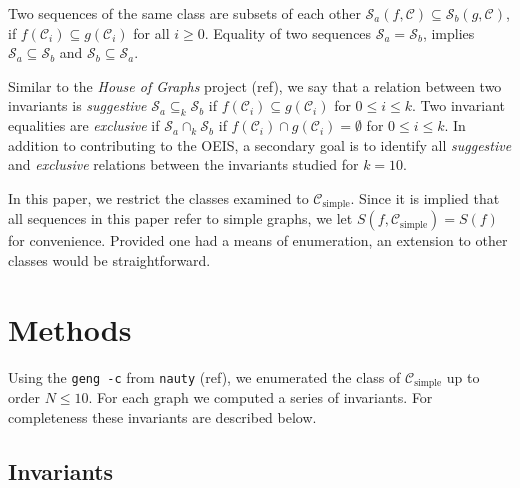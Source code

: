\documentclass[12pt]{article}
\newcommand{\SEQ}{\mathcal{S}}
\newcommand{\CLASS}{\mathcal{C}}
\newcommand{\SIMPLECLASS}{\mathcal{C}_\text{simple}}
\begin{document}
Two sequences of the same class are subsets of each other $\SEQ_a(f,\CLASS) \subseteq \SEQ_b(g, \CLASS)$, if $f(\CLASS_i) \subseteq g(\CLASS_i)$ for all $i\ge0$.
Equality of two sequences $\SEQ_a = \SEQ_b$, implies $\SEQ_a \subseteq \SEQ_b$ and $\SEQ_b \subseteq \SEQ_a$. 

Similar to the \textit{House of Graphs} project (ref), we say that a relation between two invariants is \textit{suggestive} $\SEQ_a \subseteq_k \SEQ_b$ if $f(\CLASS_i) \subseteq g(\CLASS_i)$ for $0 \le i \le k$.
Two invariant equalities are \textit{exclusive} if $\SEQ_a \cap_k \SEQ_b$ if $f(\CLASS_i) \cap g(\CLASS_i) = \emptyset$ for $0 \le i \le k$.
In addition to contributing to the OEIS, a secondary goal is to identify all \textit{suggestive} and \textit{exclusive} relations between the invariants studied for $k=10$.

In this paper, we restrict the classes examined to $\SIMPLECLASS$.
Since it is implied that all sequences in this paper refer to simple graphs, we let $S(f,\SIMPLECLASS)=S(f)$ for convenience.
Provided one had a means of enumeration, an extension to other classes would be straightforward.


\section{Methods}
Using the \texttt{geng -c} from \texttt{nauty} (ref), we enumerated the class of $\SIMPLECLASS$ up to order $N \le 10$.
For each graph we computed a series of invariants.
For completeness these invariants are described below.

\subsection{Invariants}
\end{document}
